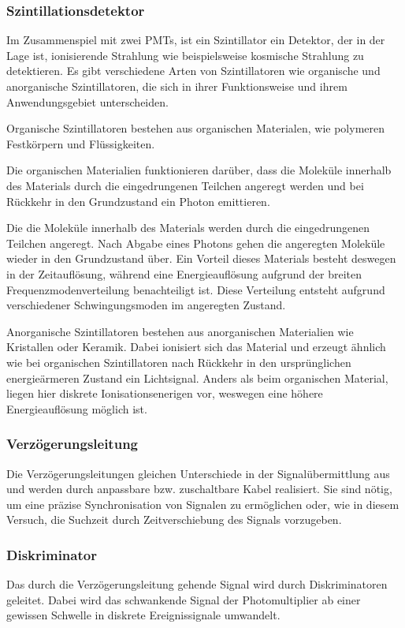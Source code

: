 \subsubsection*{Szintillationsdetektor}
Im Zusammenspiel mit zwei PMTs, ist ein Szintillator ein Detektor, der in der Lage ist, 
ionisierende Strahlung wie beispielsweise kosmische Strahlung zu detektieren. 
Es gibt verschiedene Arten von Szintillatoren wie organische und anorganische Szintillatoren,
die sich in ihrer Funktionsweise und ihrem Anwendungsgebiet unterscheiden.

Organische Szintillatoren bestehen aus organischen Materialen,
wie polymeren Festkörpern und Flüssigkeiten.

Die organischen Materialien funktionieren darüber, 
dass die Moleküle innerhalb des Materials durch die eingedrungenen Teilchen angeregt werden 
und bei Rückkehr in den Grundzustand ein Photon emittieren.

Die die Moleküle innerhalb des Materials werden durch die eingedrungenen Teilchen angeregt. 
Nach Abgabe eines Photons gehen die angeregten Moleküle wieder in den Grundzustand über.
Ein Vorteil dieses Materials besteht deswegen in der Zeitauflösung, 
während eine Energieauflösung aufgrund der breiten Frequenzmodenverteilung benachteiligt ist.
Diese Verteilung entsteht aufgrund verschiedener Schwingungsmoden im angeregten Zustand.

Anorganische Szintillatoren bestehen aus anorganischen Materialien wie Kristallen oder Keramik. 
Dabei ionisiert sich das Material und erzeugt ähnlich wie bei organischen Szintillatoren 
nach Rückkehr in den ursprünglichen energieärmeren Zustand ein Lichtsignal.
Anders als beim organischen Material, liegen hier diskrete Ionisationsenerigen vor,
weswegen eine höhere Energieauflösung möglich ist.

\subsubsection*{Verzögerungsleitung}
Die Verzögerungsleitungen gleichen Unterschiede in der Signalübermittlung aus
und werden durch anpassbare bzw. zuschaltbare Kabel realisiert.
Sie sind nötig, um eine präzise Synchronisation von Signalen zu ermöglichen
oder, wie in diesem Versuch, die Suchzeit durch Zeitverschiebung des Signals vorzugeben.

\subsubsection*{Diskriminator}
Das durch die Verzögerungsleitung gehende Signal wird durch Diskriminatoren geleitet.
Dabei wird das schwankende Signal der Photomultiplier ab einer gewissen Schwelle in diskrete
Ereignissignale umwandelt.

